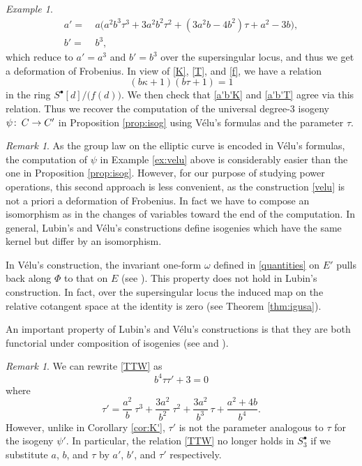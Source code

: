 \documentclass{gtpart}
\theoremstyle{definition}
\theoremstyle{remark}
\newtheorem{rmk}[thm]{Remark}
\newtheorem{ex}[thm]{Example}
\def\co{\colon\thinspace}
\newcommand{\K}{\kappa}
\newcommand{\T}{\tau}
\newcommand{\s}{S^\bullet}
\numberwithin{equation}{section}
\numberwithin{thm}{section}
\begin{document}
\begin{ex}
 \begin{equation}
 \label{a'b'T}
 \begin{split}
  a' = & ~ a \big( a^2 b^3 \T^3 + 3 a^2 b^2 \T^2 + (3 a^2 b - 4 b^2) \T + a^2 - 3 b \big), \\
  b' = & ~ b^3, 
 \end{split}
 \end{equation}
 which reduce to $a' = a^3$ and $b' = b^3$ over the supersingular locus, 
 and thus we get a deformation of Frobenius.  In view of \eqref{K}, 
 \eqref{T}, and \eqref{f}, we have a relation 
 \[
  (b \K + 1) (b \T + 1) = 1 
 \]
 in the ring $\s [d] \big/ \big( f(d) \big)$.  We then check that 
 \eqref{a'b'K} and \eqref{a'b'T} agree via this relation.  Thus we 
 recover the computation of the universal degree-3 isogeny 
 $\psi \co C \to C'$ in Proposition \ref{prop:isog} using V\'elu's 
 formulas and the parameter $\T$.  
\end{ex}

\begin{rmk}
 As the group law on the elliptic curve is encoded in V\'elu's formulas, 
 the computation of $\psi$ in Example \ref{ex:velu} above is 
 considerably easier than the one in Proposition \ref{prop:isog}.  
 However, for our purpose of studying power operations, this second 
 approach is less convenient, as the construction \eqref{velu} is not a 
 priori a deformation of Frobenius.  In fact we have to compose an 
 isomorphism as in the changes of variables toward the end of the 
 computation.  In general, Lubin's and V\'elu's constructions define 
 isogenies which have the same kernel but differ by an isomorphism.  

 In V\'elu's construction, the invariant one-form $\omega$ defined in 
 \eqref{quantities} on $E'$ pulls back along $\Phi$ to that on $E$ (see 
 \cite[Remarque 2]{velu}).  This property does not hold in Lubin's 
 construction.  In fact, over the supersingular locus the induced map 
 on the relative cotangent space at the identity is zero (see Theorem 
 \ref{thm:igusa}).  

 An important property of Lubin's and V\'elu's constructions is that 
 they are both functorial under composition of isogenies (see 
 \cite[Proposition 2.2.6]{Ando95} and \cite[Section 2.4]{kohel}).  
\end{rmk}

\begin{rmk}
 We can rewrite \eqref{TTW} as 
 \begin{equation}
 \label{charles}
  b^4 \T \T' + 3 = 0 
 \end{equation}
 where 
 \[
  \T' = \frac{a^2}{b} ~ \T^3 + \frac{3 a^2}{b^2} ~ \T^2 
  + \frac{3 a^2}{b^3} ~ \T + \frac{a^2 + 4 b}{b^4}.  
 \]
 However, unlike in Corollary \ref{cor:K'}, $\T'$ is not the parameter 
 analogous to $\T$ for the isogeny $\psi'$.  In particular, the relation 
 \eqref{TTW} no longer holds in $\s_3$ if we substitute $a$, $b$, and 
 $\T$ by $a'$, $b'$, and $\T'$ respectively.  
\end{rmk}
\end{document}

